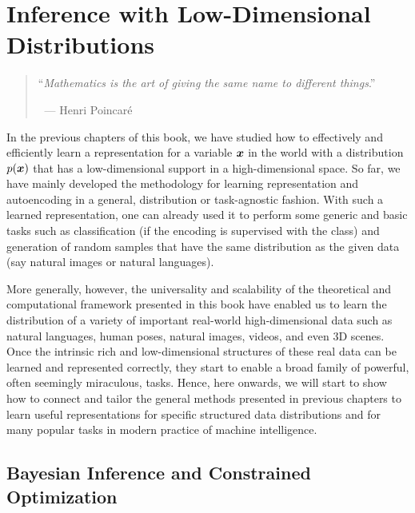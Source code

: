 \documentclass[../../book-main.tex]{subfiles}
\begin{document}
\chapter{Inference with Low-Dimensional Distributions}
\label{ch:conditional-inference}

\begin{quote}

\hfill    ``{\em Mathematics is the art of giving the same name to different things}.''

$~$ \hfill --- Henri Poincar\'e 
\end{quote}
\vspace{5mm}


In the previous chapters of this book, we have studied how to effectively and efficiently learn a representation for a variable $\bm{x}$ in the world with a distribution $p(\bm{x})$ that has a low-dimensional support in a high-dimensional space.  So far, we have mainly developed the methodology for learning representation and autoencoding in a general, distribution or task-agnostic fashion. With such a learned representation, one can already used it to perform some generic and basic tasks such as classification (if the encoding is supervised with the class) and generation of random samples that have the same distribution as the given data (say  natural images or natural languages). 

More generally, however, the universality and scalability of the theoretical and computational framework presented in this book have enabled us to learn the distribution of a variety of important real-world high-dimensional data such as natural languages, human poses, natural images, videos, and even 3D scenes. Once the intrinsic rich and low-dimensional structures of these real data can be learned and represented correctly, they start to enable a broad family of powerful, often seemingly miraculous, tasks. Hence, here onwards, we will start to show how to connect and tailor the general methods presented in previous chapters to learn useful representations for specific structured data distributions and for many popular tasks in modern practice of machine intelligence. 

\section{Bayesian Inference and Constrained Optimization}
\end{document}
